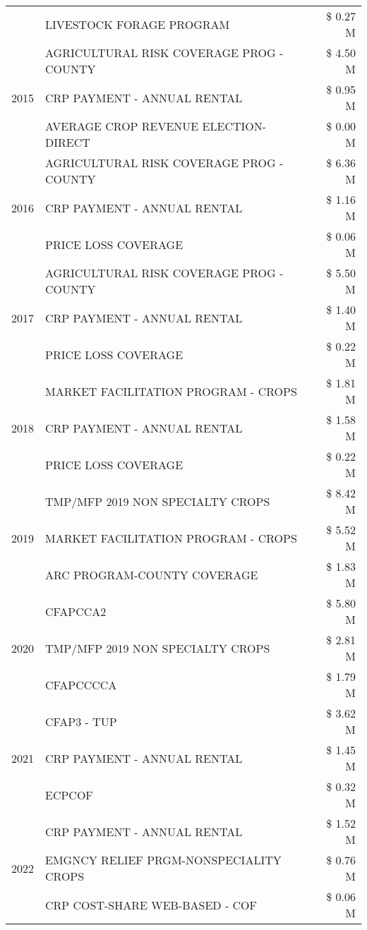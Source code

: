 \begin{tabular}{llr}
 & LIVESTOCK FORAGE PROGRAM & \$ 0.27 M \\
\cline{1-3}
\multirow[t]{3}{*}{2015} & AGRICULTURAL RISK COVERAGE PROG - COUNTY & \$ 4.50 M \\
 & CRP PAYMENT - ANNUAL RENTAL & \$ 0.95 M \\
 & AVERAGE CROP REVENUE ELECTION-DIRECT & \$ 0.00 M \\
\cline{1-3}
\multirow[t]{3}{*}{2016} & AGRICULTURAL RISK COVERAGE PROG - COUNTY & \$ 6.36 M \\
 & CRP PAYMENT - ANNUAL RENTAL & \$ 1.16 M \\
 & PRICE LOSS COVERAGE & \$ 0.06 M \\
\cline{1-3}
\multirow[t]{3}{*}{2017} & AGRICULTURAL RISK COVERAGE PROG - COUNTY & \$ 5.50 M \\
 & CRP PAYMENT - ANNUAL RENTAL & \$ 1.40 M \\
 & PRICE LOSS COVERAGE & \$ 0.22 M \\
\cline{1-3}
\multirow[t]{3}{*}{2018} & MARKET FACILITATION PROGRAM - CROPS & \$ 1.81 M \\
 & CRP PAYMENT - ANNUAL RENTAL & \$ 1.58 M \\
 & PRICE LOSS COVERAGE & \$ 0.22 M \\
\cline{1-3}
\multirow[t]{3}{*}{2019} & TMP/MFP 2019 NON SPECIALTY CROPS & \$ 8.42 M \\
 & MARKET FACILITATION PROGRAM - CROPS & \$ 5.52 M \\
 & ARC PROGRAM-COUNTY COVERAGE & \$ 1.83 M \\
\cline{1-3}
\multirow[t]{3}{*}{2020} & CFAPCCA2 & \$ 5.80 M \\
 & TMP/MFP 2019 NON SPECIALTY CROPS & \$ 2.81 M \\
 & CFAPCCCCA & \$ 1.79 M \\
\cline{1-3}
\multirow[t]{3}{*}{2021} & CFAP3 - TUP & \$ 3.62 M \\
 & CRP PAYMENT - ANNUAL RENTAL & \$ 1.45 M \\
 & ECPCOF & \$ 0.32 M \\
\cline{1-3}
\multirow[t]{3}{*}{2022} & CRP PAYMENT - ANNUAL RENTAL & \$ 1.52 M \\
 & EMGNCY RELIEF PRGM-NONSPECIALITY CROPS & \$ 0.76 M \\
 & CRP COST-SHARE WEB-BASED - COF & \$ 0.06 M \\
\cline{1-3}
\bottomrule
\end{tabular}
